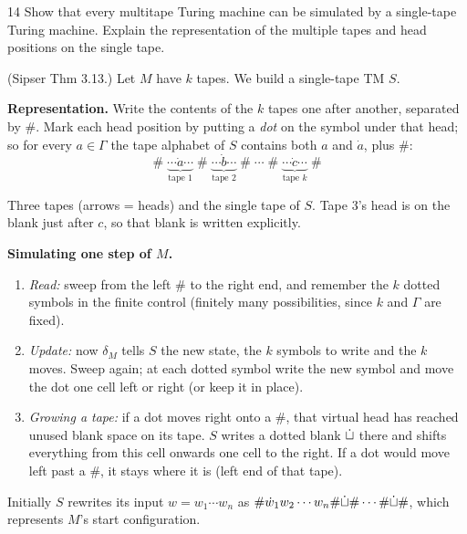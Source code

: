 \begin{question}{14}
Show that every multitape Turing machine can be simulated by a single-tape Turing machine. Explain the representation of the multiple tapes and head positions on the single tape.
\end{question}
\begin{soln}
(Sipser Thm 3.13.) Let $M$ have $k$ tapes. We build a single-tape TM $S$.

\textbf{Representation.} Write the contents of the $k$ tapes one after another, separated by $\#$. Mark each head position by putting a \emph{dot} on the symbol under that head; so for every $a\in\Gamma$ the tape alphabet of $S$ contains both $a$ and $\dot a$, plus $\#$:
\[
\#\;\underbrace{\cdots\dot a\cdots}_{\text{tape 1}}\;\#\;\underbrace{\cdots\dot b\cdots}_{\text{tape 2}}\;\#\;\cdots\;\#\;\underbrace{\cdots\dot c\cdots}_{\text{tape }k}\;\#
\]

\begin{center}

{\footnotesize Three tapes (arrows = heads) and the single tape of $S$. Tape 3's head is on the blank just after $c$, so that blank is written explicitly.}
\end{center}

\textbf{Simulating one step of $M$.}
\begin{enumerate}
\item \emph{Read:} sweep from the left $\#$ to the right end, and remember the $k$ dotted symbols in the finite control (finitely many possibilities, since $k$ and $\Gamma$ are fixed).
\item \emph{Update:} now $\delta_M$ tells $S$ the new state, the $k$ symbols to write and the $k$ moves. Sweep again; at each dotted symbol write the new symbol and move the dot one cell left or right (or keep it in place).
\item \emph{Growing a tape:} if a dot moves right onto a $\#$, that virtual head has reached unused blank space on its tape. $S$ writes a dotted blank $\dot{\sqcup}$ there and shifts everything from this cell onwards one cell to the right. If a dot would move left past a $\#$, it stays where it is (left end of that tape).
\end{enumerate}
Initially $S$ rewrites its input $w=w_1\cdots w_n$ as $\#\dot w_1w_2\cdots w_n\#\dot{\sqcup}\#\cdots\#\dot{\sqcup}\#$, which represents $M$'s start configuration.


\end{soln}
